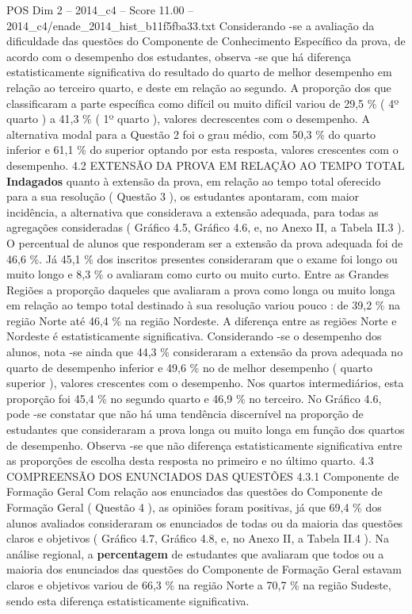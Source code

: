 \begin{textsample}{POS Dim 2 – 2014\_c4 – Score 11.00 – 2014\_c4/enade\_2014\_hist\_b11f5fba33.txt}
Considerando -se a avaliação da dificuldade das questões do Componente de Conhecimento Específico da prova, de acordo com o desempenho dos estudantes, observa -se que há diferença estatisticamente significativa do resultado do quarto de melhor desempenho em relação ao terceiro quarto, e deste em relação ao segundo.
A proporção dos que classificaram a parte específica como difícil ou muito difícil variou de 29,5 \% ( 4º quarto ) a 41,3 \% ( 1º quarto ), valores decrescentes com o desempenho.
A alternativa modal para a Questão 2 foi o grau médio, com 50,3 \% do quarto inferior e 61,1 \% do superior optando por esta resposta, valores crescentes com o desempenho. 4.2 EXTENSÃO DA PROVA EM RELAÇÃO AO TEMPO TOTAL \textbf{Indagados} quanto à extensão da prova, em relação ao tempo total oferecido para a sua resolução ( Questão 3 ), os estudantes apontaram, com maior incidência, a alternativa que considerava a extensão adequada, para todas as agregações consideradas ( Gráfico 4.5, Gráfico 4.6, e, no Anexo II, a Tabela II.3 ).
O percentual de alunos que responderam ser a extensão da prova adequada foi de 46,6 \%.
Já 45,1 \% dos inscritos presentes consideraram que o exame foi longo ou muito longo e 8,3 \% o avaliaram como curto ou muito curto.
Entre as Grandes Regiões a proporção daqueles que avaliaram a prova como longa ou muito longa em relação ao tempo total destinado à sua resolução variou pouco : de 39,2 \% na região Norte até 46,4 \% na região Nordeste.
A diferença entre as regiões Norte e Nordeste é estatisticamente significativa.
Considerando -se o desempenho dos alunos, nota -se ainda que 44,3 \% consideraram a extensão da prova adequada no quarto de desempenho inferior e 49,6 \% no de melhor desempenho ( quarto superior ), valores crescentes com o desempenho.
Nos quartos intermediários, esta proporção foi 45,4 \% no segundo quarto e 46,9 \% no terceiro.
No Gráfico 4.6, pode -se constatar que não há uma tendência discernível na proporção de estudantes que consideraram a prova longa ou muito longa em função dos quartos de desempenho.
Observa -se que não diferença estatisticamente significativa entre as proporções de escolha desta resposta no primeiro e no último quarto. 4.3 COMPREENSÃO DOS ENUNCIADOS DAS QUESTÕES 4.3.1 Componente de Formação Geral Com relação aos enunciados das questões do Componente de Formação Geral ( Questão 4 ), as opiniões foram positivas, já que 69,4 \% dos alunos avaliados consideraram os enunciados de todas ou da maioria das questões claros e objetivos ( Gráfico 4.7, Gráfico 4.8, e, no Anexo II, a Tabela II.4 ).
Na análise regional, a \textbf{percentagem} de estudantes que avaliaram que todos ou a maioria dos enunciados das questões do Componente de Formação Geral estavam claros e objetivos variou de 66,3 \% na região Norte a 70,7 \% na região Sudeste, sendo esta diferença estatisticamente significativa.

\end{textsample}
